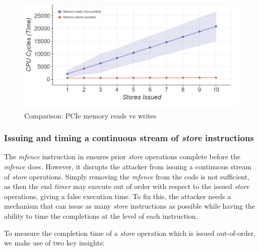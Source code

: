 \begin{figure}[!htb]
    \centering
    \includegraphics[width=0.8\columnwidth]{figures/interconnect-sc/store-ops/pcie_mem_reads_v_writes.png}
    \caption{Comparison: PCIe memory reads vs writes}
    \label{fig:pcie-mem-reads-v-writes}
\end{figure}

\begin{minipage}{\textwidth}
    
    \captionsetup{type=lstlisting}
    \caption{Profiling the execution time of \textit{load/store} instruction.
    Each \textit{load} or \textit{store} instruction is issued on a unique memory address over 64 bytes from the previous address.}
    \label{lst:pcie-mem-reads-v-writes}
\end{minipage}

\subsubsection{Issuing and timing a continuous stream of \textit{store} instructions}
\label{subsubsec:interconnect-sc-store-ops-challenges-measuring-time}

The \textit{mfence} instruction in  ensures prior \textit{store} operations complete before the \textit{mfence} does.
However, it disrupts the attacker from issuing a continuous stream of \textit{store} operations.
Simply removing the \textit{mfence} from the code is not sufficient, as then the end \textit{timer} may execute out of order with respect to the issued \textit{store} operations, giving a false execution time.
To fix this, the attacker needs a mechanism that can issue as many \textit{store} instructions as possible while having the ability to time the completions at the level of each instruction.

To measure the completion time of a \textit{store} operation which is issued out-of-order, we make use of two key insights:

